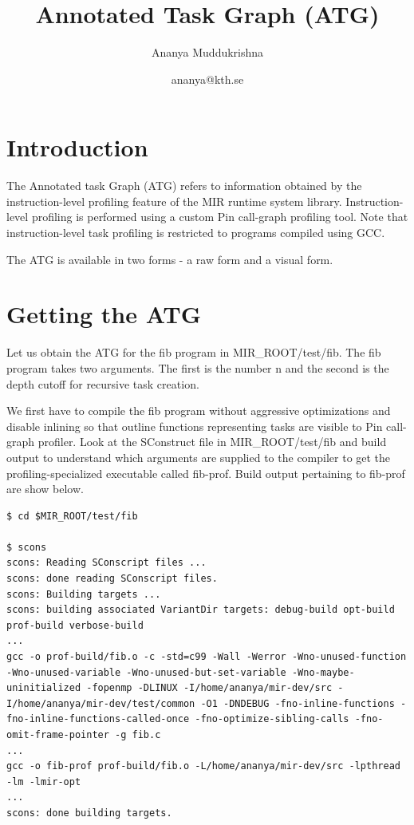 \documentclass[11pt,a4paper,notitlepage]{article}
\author{Ananya Muddukrishna}
\date{ananya@kth.se}
\title{Annotated Task Graph (ATG)}
\begin{document}
\maketitle


\section{Introduction}
The Annotated task Graph (ATG) refers to information obtained by the instruction-level profiling feature of the MIR runtime system library.
Instruction-level profiling is performed using a custom Pin call-graph profiling tool.
Note that instruction-level task profiling is restricted to programs compiled using GCC.

The ATG is available in two forms - a raw form and a visual form.

\section{Getting the ATG}
\label{sec:getting-atg}
Let us obtain the ATG for the fib program in MIR\_ROOT/test/fib.
The fib program takes two arguments. The first is the number n and the second is the depth cutoff for recursive task creation.

We first have to compile the fib program without aggressive optimizations and disable inlining so that outline functions representing tasks are visible to Pin call-graph profiler. 
Look at the SConstruct file in MIR\_ROOT/test/fib and build output to understand which arguments are supplied to the compiler to get the profiling-specialized executable called fib-prof. 
Build output pertaining to fib-prof are show below.

\begin{lstlisting}[style=BashInputStyle]
$ cd $MIR_ROOT/test/fib

$ scons 
scons: Reading SConscript files ...
scons: done reading SConscript files.
scons: Building targets ...
scons: building associated VariantDir targets: debug-build opt-build prof-build verbose-build
...
gcc -o prof-build/fib.o -c -std=c99 -Wall -Werror -Wno-unused-function -Wno-unused-variable -Wno-unused-but-set-variable -Wno-maybe-uninitialized -fopenmp -DLINUX -I/home/ananya/mir-dev/src -I/home/ananya/mir-dev/test/common -O1 -DNDEBUG -fno-inline-functions -fno-inline-functions-called-once -fno-optimize-sibling-calls -fno-omit-frame-pointer -g fib.c
...
gcc -o fib-prof prof-build/fib.o -L/home/ananya/mir-dev/src -lpthread -lm -lmir-opt
...
scons: done building targets.
\end{lstlisting}
\end{document}

